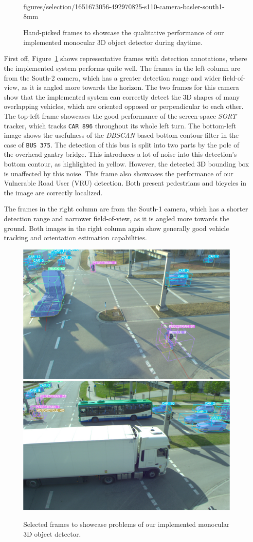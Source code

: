 \begin{figure}[htb]
{        figures/selection/1651673056-492970825-s110-camera-basler-south1-8mm}
    \caption{Hand-picked frames to showcase the qualitative performance of our implemented monocular 3D object detector during daytime.}
    \label{fig:qualitative-results-day}
\end{figure}

First off, Figure~\ref{fig:qualitative-results-day} shows representative frames with detection annotations, where the implemented system performs quite well.
The frames in the left column are from the South-2 camera, which has a greater detection range and wider field-of-view, as it is angled more towards the horizon.
The two frames for this camera show that the implemented system can correctly detect the 3D shapes of many overlapping vehicles, which are oriented opposed or perpendicular to each other.
The top-left frame showcases the good performance of the screen-space \textit{SORT} tracker, which tracks \texttt{CAR 896} throughout its whole left turn.
The bottom-left image shows the usefulness of the \textit{DBSCAN}-based bottom contour filter in the case of \texttt{BUS 375}.
The detection of this bus is split into two parts by the pole of the overhead gantry bridge.
This introduces a lot of noise into this detection's bottom contour, as highlighted in yellow.
However, the detected 3D bounding box is unaffected by this noise.
This frame also showcases the performance of our Vulnerable Road User (VRU) detection.
Both present pedestrians and bicycles in the image are correctly localized.

The frames in the right column are from the South-1 camera, which has a shorter detection range and narrower field-of-view, as it is angled more towards the ground.
Both images in the right column again show generally good vehicle tracking and orientation estimation capabilities.

\begin{figure}[htb]
    \includegraphics[width=0.499\linewidth]{
        figures/selection/1646667395-641065639-s110-camera-basler-south1-8mm}
    \includegraphics[width=0.499\linewidth]{
        figures/selection/1651673050-162472285-s110-camera-basler-south1-8mm}
    \caption{Selected frames to showcase problems of our implemented monocular 3D object detector.}
    \label{fig:qualitative-results-bad}
\end{figure}

